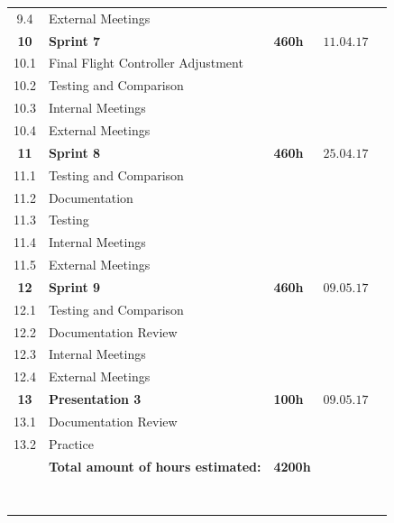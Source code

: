 \begin{center}
\begin{tabular}{cllll}
\\\rowcolor{gainsboro}
9.4       & External Meetings      &    & \\
\textbf{10} & \textbf{Sprint 7}     & \textbf{460h}     & $11.04.17$ \\
\rowcolor{gainsboro}
10.1     & Final Flight Controller Adjustment &  & \\
10.2     & Testing and Comparison & & 
\\\rowcolor{gainsboro}
10.3       & Internal Meetings      &    & \\
10.4       & External Meetings      &    & 
\\\rowcolor{gainsboro}
\rowcolor{gainsboro}
\textbf{11} & \textbf{Sprint 8}     & \textbf{460h}    & $25.04.17$ \\
11.1     & Testing and Comparison              &  &  \\\rowcolor{gainsboro}
11.2     & Documentation &  &  \\
11.3     & Testing & &  \\\rowcolor{gainsboro}
11.4       & Internal Meetings      &    & \\
11.5       & External Meetings      &    & 
\\\rowcolor{gainsboro}
\rowcolor{gainsboro}
\textbf{12} & \textbf{Sprint 9}     & \textbf{460h}     & $09.05.17$ \\
12.1     & Testing and Comparison &  &  \\\rowcolor{gainsboro}
12.2     & Documentation Review &  & \\
12.3       & Internal Meetings      &    & 
\\\rowcolor{gainsboro}
12.4       & External Meetings      &    & \\
\textbf{13} & \textbf{Presentation 3}     & \textbf{100h}     & $09.05.17$ \\
\rowcolor{gainsboro}
13.1     & Documentation Review &  & \\
13.2     & Practice & & \\
\rowcolor{gainsboro}
         & \textbf{Total amount of hours estimated:} & \textbf{4200h} & 
         \\\\\\\\\
\end{tabular}                                                               
\end{center}

